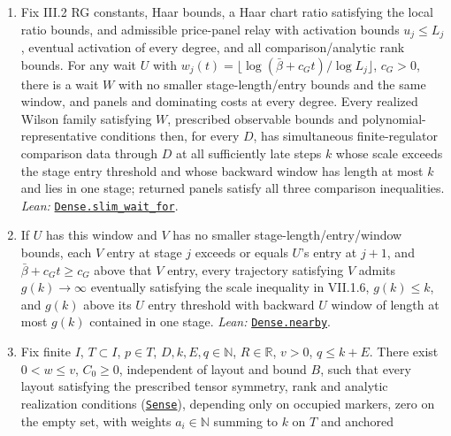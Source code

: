 \documentclass[
  letterpaper,
  11pt]{article}
\begin{document}
\begin{enumerate}
\def\labelenumi{(\alph{enumi})}
\item
  Fix III.2 RG constants, Haar bounds, a Haar chart ratio satisfying the
  local ratio bounds, and admissible price-panel relay with activation
  bounds \(u_j\le L_j\), eventual activation of every degree, and all
  comparison/analytic rank bounds. For any wait \(U\) with
  \(w_j(t)=\lfloor\log(\bar\beta+c_Gt)/\log L_j\rfloor\), \(c_G>0\),
  there is a wait \(W\) with no smaller stage-length/entry bounds and
  the same window, and panels and dominating costs at every degree.
  Every realized Wilson family satisfying \(W\), prescribed observable
  bounds and polynomial-representative conditions then, for every \(D\),
  has simultaneous finite-regulator comparison data through \(D\) at all
  sufficiently late steps \(k\) whose scale exceeds the stage entry
  threshold and whose backward window has length at most \(k\) and lies
  in one stage; returned panels satisfy all three comparison
  inequalities. \emph{Lean:}
  \href{https://github.com/yang-mills-group/OpenAI-YM-20261028/blob/3456e5e75cf8d4cd558955a5c7638fba2d68f464/YM/SharpGram/Dense/Slender.lean\#L127-L143}{\texttt{Dense.slim\_wait\_for}}.
\item
  If \(U\) has this window and \(V\) has no smaller
  stage-length/entry/window bounds, each \(V\) entry at stage \(j\)
  exceeds or equals \(U\)'s entry at \(j+1\), and
  \(\bar\beta+c_Gt\ge c_G\) above that \(V\) entry, every trajectory
  satisfying \(V\) admits \(g(k)\to\infty\) eventually satisfying the
  scale inequality in VII.1.6, \(g(k)\le k\), and \(g(k)\) above its
  \(U\) entry threshold with backward \(U\) window of length at most
  \(g(k)\) contained in one stage. \emph{Lean:}
  \href{https://github.com/yang-mills-group/OpenAI-YM-20261028/blob/3456e5e75cf8d4cd558955a5c7638fba2d68f464/YM/SharpGram/Dense/Cover.lean\#L155-L165}{\texttt{Dense.nearby}}.
\item
  Fix finite \(I\), \(T\subset I\), \(p\in T\), \(D,k,E,q\in\mathbb N\),
  \(R\in\mathbb R\), \(v>0\), \(q\le k+E\). There exist \(0<w\le v\),
  \(C_0\ge0\), independent of layout and bound \(B\), such that every
  layout satisfying the prescribed tensor symmetry, rank and analytic
  realization conditions
  (\href{https://github.com/yang-mills-group/OpenAI-YM-20261028/blob/3456e5e75cf8d4cd558955a5c7638fba2d68f464/YM/RG08/Creek/Step.lean\#L16-L20}{\texttt{Sense}}),
  depending only on occupied markers, zero on the empty set, with
  weights \(a_i\in\mathbb N\) summing to \(k\) on \(T\) and anchored

\end{enumerate}
\end{document}
